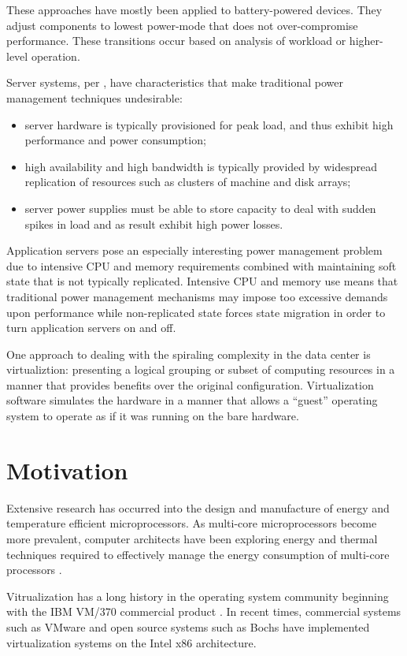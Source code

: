 \documentclass[preprint]{sigplanconf}
\begin{document}
These approaches have mostly been applied to battery-powered devices.   They
adjust components to lowest power-mode that does not over-compromise
performance.    These transitions occur based on analysis of workload or
higher-level operation.

Server systems, per \cite{Bianchini2004}, have characteristics that make
traditional power management techniques undesirable:
\begin{itemize}
\item server hardware is typically provisioned for peak load, and thus
  exhibit high performance and power consumption;
\item high availability and high bandwidth is typically provided by widespread
  replication of resources such as clusters of machine and disk arrays;
\item server power supplies must be able to store capacity to deal with sudden
  spikes in load and as result exhibit high power losses.
\end{itemize}

Application servers pose an especially interesting power management problem due
to intensive CPU and memory requirements combined with maintaining soft state
that is not typically replicated.   Intensive CPU and memory use means that
traditional power management mechanisms may impose too excessive demands upon
performance while non-replicated state forces state migration in order to turn
application servers on and off.

One approach to dealing with the spiraling complexity in the data center is
virtualiztion: presenting a logical grouping or subset of computing resources
in a manner that provides benefits over the original configuration.
Virtualization software simulates the hardware in a manner that allows a
``guest'' operating system to operate as if it was running on the bare
hardware.

\section{Motivation}
\label{sec:Motivation}
Extensive research has occurred into the design and manufacture of energy and
temperature efficient microprocessors.   As multi-core
microprocessors become more prevalent, computer architects have been exploring
energy and thermal techniques required to effectively manage the energy
consumption of multi-core processors \cite{Donald2006}.

Vitrualization has a long history in the operating system community beginning
with the IBM VM/370 commercial product \cite{Gum1983}.  In recent times,
commercial systems such as VMware \cite{VMWare2005} and open source systems
such as Bochs \cite{Bochs2006} have implemented virtualization systems on the
Intel x86 architecture.
\end{document}
